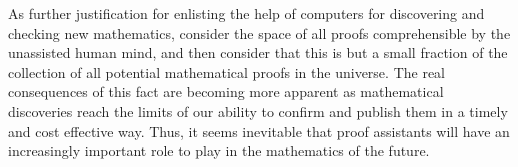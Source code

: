 \documentclass[12pt]{amsart}  %
\begin{document}
As further justification for enlisting the help of computers for discovering and checking new mathematics, consider the space of all proofs comprehensible by the unassisted human mind, and then consider that this is but a small fraction of the collection of all potential mathematical proofs in the universe. The real consequences of this fact are becoming more apparent as mathematical discoveries reach the limits of our ability to confirm and publish them in a timely and cost effective way. Thus, it seems inevitable that proof assistants will have an increasingly important role to play in the mathematics of the future.


\end{document}
